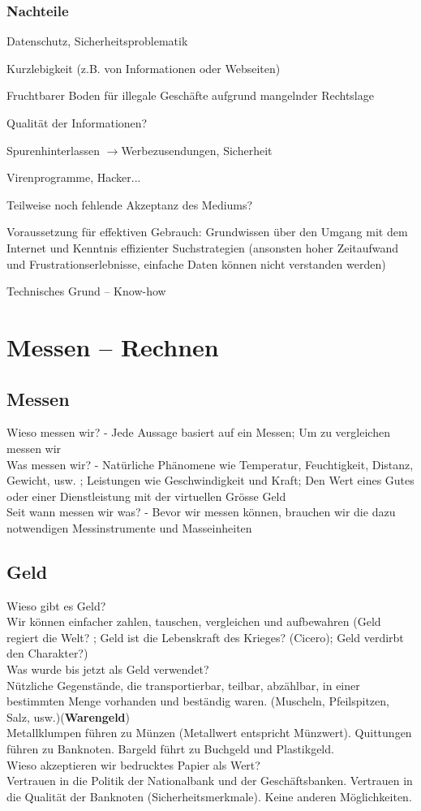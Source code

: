 \documentclass[10pt, openright=true]{scrartcl}
\begin{document}
\subsubsection{Nachteile}
\begin{citemize}
\item Datenschutz, Sicherheitsproblematik
\item Kurzlebigkeit (z.B. von Informationen oder Webseiten)
\item Fruchtbarer Boden für illegale Geschäfte aufgrund mangelnder Rechtslage
\item Qualität der Informationen?
\item Spurenhinterlassen $ \rightarrow $Werbezusendungen, Sicherheit
\item Virenprogramme, Hacker...
\item Teilweise noch fehlende Akzeptanz des Mediums?
\item Voraussetzung für effektiven Gebrauch: Grundwissen über den Umgang mit dem Internet und Kenntnis effizienter Suchstrategien (ansonsten hoher Zeitaufwand und Frustrationserlebnisse, einfache Daten können nicht verstanden werden)
\item Technisches Grund – Know-how
\end{citemize}
\section{Messen – Rechnen}
\subsection{Messen}
Wieso messen wir? - Jede Aussage basiert auf ein Messen; Um zu vergleichen messen wir\\
Was messen wir? - Natürliche Phänomene wie Temperatur, Feuchtigkeit, Distanz, Gewicht, usw. ; Leistungen wie Geschwindigkeit und Kraft; Den Wert eines Gutes oder einer Dienstleistung mit der virtuellen Grösse Geld\\
Seit wann messen wir was? - Bevor wir messen können, brauchen wir die dazu notwendigen Messinstrumente und Masseinheiten
\subsection{Geld}
Wieso gibt es Geld? \\
Wir können einfacher zahlen, tauschen, vergleichen und aufbewahren (Geld regiert die Welt? ; Geld ist die Lebenskraft des Krieges? (Cicero); Geld verdirbt den Charakter?)\\
Was wurde bis jetzt als Geld verwendet?\\
Nützliche Gegenstände, die transportierbar, teilbar, abzählbar, in einer bestimmten Menge vorhanden und beständig waren. (Muscheln, Pfeilspitzen, Salz, usw.)(\textbf{Warengeld})\\
Metallklumpen führen zu Münzen (Metallwert entspricht Münzwert). Quittungen führen zu Banknoten. Bargeld führt zu Buchgeld und Plastikgeld. \\
Wieso akzeptieren wir bedrucktes Papier als Wert?\\
Vertrauen in die Politik der Nationalbank und der Geschäftsbanken. Vertrauen in die Qualität der Banknoten (Sicherheitsmerkmale). Keine anderen Möglichkeiten.
\end{document}
